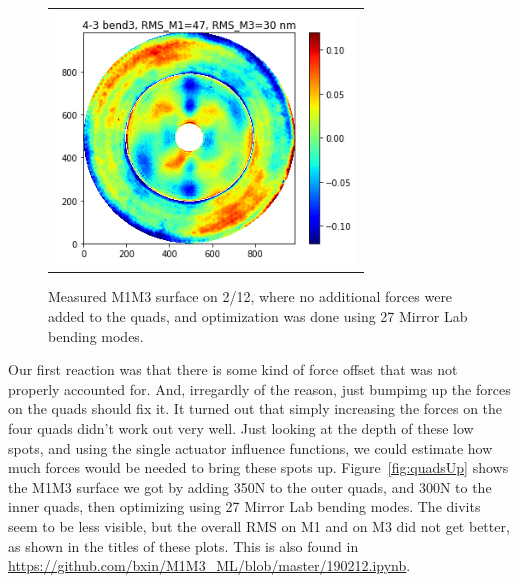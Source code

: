 \documentclass [twoside,openbib,12pt]{article}
\begin{document}
 \begin{figure}[bthp]
   \begin{center}
     \begin{tabular}{c}
\includegraphics[width=80mm]{figures/divits_190212.png}
  \end{tabular}
   \end{center}
   \caption
   { \label{fig:divits}
     Measured M1M3 surface on 2/12, where no additional forces were
     added to the quads, and optimization was done using 27 Mirror
     Lab bending modes.
 }
\end{figure}


Our first reaction was that there is some kind of force offset that
was not properly accounted for. And, irregardly of the reason, just 
bumpimg up the forces on the quads should fix it.
It turned out that simply increasing the forces on the four quads
didn't work out very well.
Just looking at the depth of these low spots, and using the single
actuator influence functions, we could estimate how much forces would be
needed to bring these spots up.
Figure~\ref{fig:quadsUp} shows the M1M3 surface we got by adding 350N to the outer
     quads, and 300N to the inner quads, then optimizing using 27 Mirror Lab
     bending modes.
     The divits seem to be less visible, but the overall RMS on M1 and
     on M3 did not get better, as shown in the titles of these plots.
   This is also found in \url{https://github.com/bxin/M1M3_ML/blob/master/190212.ipynb}.
     
\end{document}
